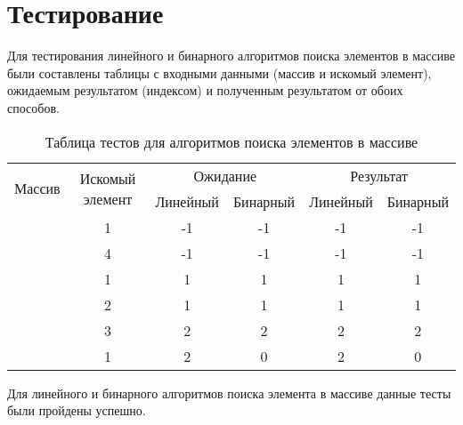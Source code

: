 \section{Тестирование}
Для тестирования линейного и бинарного алгоритмов поиска элементов в массиве были составлены таблицы с входными данными (массив и искомый элемент), ожидаемым результатом (индексом) и полученным результатом от обоих способов.
\begin{table}[H]
	\centering
	\caption{Таблица тестов для алгоритмов поиска элементов в массиве}
	\begin{tabular}{|c|c|c|c|c|c|}
		\hline
		\multirow{2}{*}{Массив} & \multirow{2}{*}{Искомый элемент} & \multicolumn{2}{|c|}{Ожидание} & \multicolumn{2}{|c|}{Результат} \\ \cline{3-6}
		& & Линейный & Бинарный & Линейный & Бинарный \\ \hline
		[] & 1 & -1 & -1 & -1 & -1 \\ \hline
		[1, 2, 3] & 4 & -1 & -1 & -1 & -1 \\ \hline
		[1, 2, 3] & 1 & 1 & 1 & 1 & 1 \\ \hline
		[1, 2, 3] & 2 & 1 & 1 & 1 & 1 \\ \hline
		[1, 2, 3] & 3 & 2 & 2 & 2 & 2 \\ \hline
		[3, 2, 1] & 1 & 2 & 0 & 2 & 0 \\ \hline
	\end{tabular}
\end{table}

Для линейного и бинарного алгоритмов поиска элемента в массиве данные тесты были пройдены успешно.